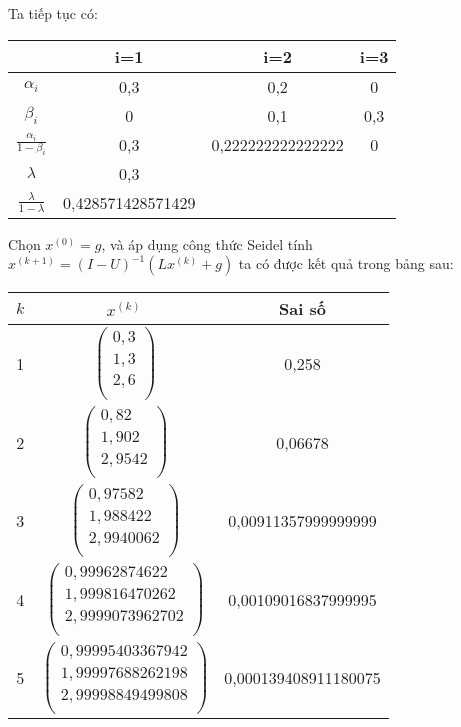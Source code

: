 Ta tiếp tục có:
\begin{center} \begin{tabular}{|c|c|c|c|}\hline
&i=1&i=2&i=3\\\hline
$\alpha_i$&0,3&0,2&0\\\hline
$\beta_i$&0&0,1&0,3\\\hline
$\frac{\alpha_i}{1-\beta_i}$&0,3&0,222222222222222&0\\\hline
$\lambda$&0,3&&\\\hline
$\frac{\lambda}{1-\lambda}$&0,428571428571429&&\\\hline
\end{tabular}\end{center}
Chọn $x^{(0)}=g$, và áp dụng công thức Seidel tính $x^{(k+1)}=(I-U)^{-1}(Lx^{(k)}+g)$ ta có được kết quả trong bảng sau:
\begin{center} \begin{tabular}{|c|c|c|}\hline
$k$&$x^{(k)}$&Sai số\\\hline
1&$\begin{pmatrix}0,3\\1,3\\2,6\\\end{pmatrix}$&0,258\\\hline
2&$\begin{pmatrix}0,82\\1,902\\2,9542\\\end{pmatrix}$&0,06678\\\hline
3&$\begin{pmatrix}0,97582\\1,988422\\2,9940062\\\end{pmatrix}$&0,00911357999999999\\\hline
4&$\begin{pmatrix}0,99962874622\\1,999816470262\\2,9999073962702\\\end{pmatrix}$&0,00109016837999995\\\hline
5&$\begin{pmatrix}0,99995403367942\\1,99997688262198\\2,99998849499808\\\end{pmatrix}$&0,000139408911180075\\\hline
\end{tabular}\end{center}
